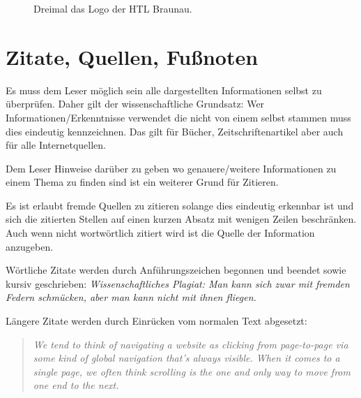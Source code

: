 \begin{figure}[H]
  \centering
  \qquad
\qquad
  \label{fig:canvas_04}
\caption[Drei Logos der HTL Braunau]{Dreimal das Logo der HTL Braunau.}
\end{figure}


\section{Zitate, Quellen, Fußnoten}

Es muss dem Leser möglich sein alle dargestellten Informationen selbst zu überprüfen.
Daher gilt der wissenschaftliche Grundsatz: 
Wer Informationen/Erkenntnisse verwendet die nicht von einem selbst stammen muss dies eindeutig kennzeichnen.
Das gilt für Bücher, Zeitschriftenartikel aber auch für alle Internetquellen.

Dem Leser Hinweise darüber zu geben wo genauere/weitere Informationen zu einem Thema zu finden sind ist ein weiterer Grund für Zitieren.

Es ist erlaubt fremde Quellen zu zitieren solange dies eindeutig erkennbar ist und sich die zitierten Stellen auf einen kurzen Absatz mit wenigen Zeilen beschränken. Auch wenn nicht wortwörtlich zitiert wird ist die Quelle der Information anzugeben.

Wörtliche Zitate werden durch Anführungszeichen begonnen und beendet sowie kursiv geschrieben: 
\emph{\glqq Wissenschaftliches Plagiat: Man kann sich zwar mit fremden Federn schmücken, aber man kann nicht mit ihnen fliegen.\grqq}~\cite{bib:uhlenbruck1}


Längere Zitate werden durch Einrücken vom normalen Text abgesetzt:
\begin{quotation}
\noindent
\emph{\glqq We tend to think of navigating a website as clicking from page-to-page via some kind of global navigation that’s always visible. When it comes to a single page, we often think scrolling is the one and only way to move from one end to the next.\grqq}~\cite{bib:bradley1}
\end{quotation}

